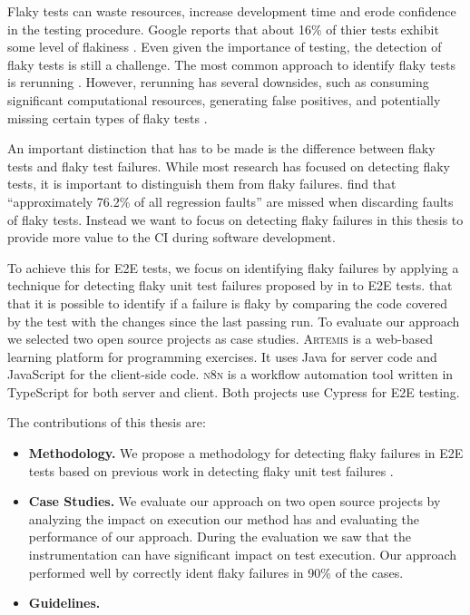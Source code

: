 Flaky tests can waste resources, increase development time and erode confidence in the testing procedure. Google reports that about 16\% of thier tests exhibit some level of flakiness \autocite{micco_state_2017}. Even given the importance of testing, the detection of flaky tests is still a challenge. The most common approach to identify flaky tests is rerunning \autocite{lam_idflakies_2019}. However, rerunning has several downsides, such as consuming significant computational resources, generating false positives, and potentially missing certain types of flaky tests \autocite{bell_deflaker_2018, luo_empirical_2014}.

An important distinction that has to be made is the difference between flaky tests and flaky test failures. While most research has focused on detecting flaky tests, it is important to distinguish them from flaky failures.  find that \enquote{approximately 76.2\% of all regression faults} \autocite{haben_importance_2023} are missed when discarding faults of flaky tests. Instead we want to focus on detecting flaky failures in this thesis to provide more value to the \ac{CI} during software development. 

To achieve this for \ac{E2E} tests, we focus on identifying flaky failures by applying a technique for detecting flaky unit test failures proposed by \citeauthor*{bell_deflaker_2018} in  \autocite{bell_deflaker_2018} to \ac{E2E} tests.  that that it is possible to identify if a failure is flaky by comparing the code covered by the test with the changes since the last passing run. To evaluate our approach we selected two open source projects as case studies. \textsc{Artemis} \autocite{krusche_artemis_2018} is a web-based learning platform for programming exercises. It uses Java for server code and JavaScript for the client-side code. \textsc{n8n} \autocite{noauthor_n8n_2023} is a workflow automation tool written in TypeScript for both server and client. Both projects use Cypress \autocite{noauthor_cypress-iocypress_2023} for \ac{E2E} testing.

The contributions of this thesis are:
\begin{itemize}
	\item \textbf{Methodology.} We propose a methodology for detecting flaky failures in \ac{E2E} tests based on previous work in detecting flaky unit test failures \autocite{bell_deflaker_2018}.
	\item \textbf{Case Studies.} We evaluate our approach on two open source projects by analyzing the impact on execution our method has and evaluating the performance of our approach. During the evaluation we saw that the instrumentation can have significant impact on test execution. Our approach performed well by correctly ident flaky failures in 90\% of the cases.
	\item \textbf{Guidelines.} 
\end{itemize}

